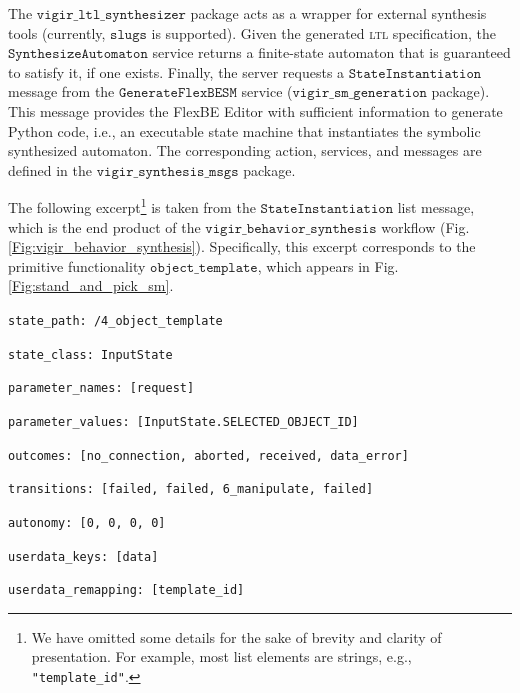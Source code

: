 The $\mathtt{vigir\_ltl\_synthesizer}$ package acts as a wrapper for external synthesis tools (currently, $\mathtt{slugs}$\cite{SLUGS} is supported).
Given the generated \textsc{ltl} specification, the $\mathtt{Synthesize Automaton}$ service returns a finite-state automaton that is guaranteed to satisfy it, if one exists.
Finally, the server requests a $\mathtt{State Instantiation}$ message from the $\mathtt{Generate FlexBE SM}$ service ($\mathtt{vigir\_sm\_generation}$ package).
This message provides the FlexBE Editor with sufficient information to generate Python code, i.e., an executable state machine that instantiates the symbolic synthesized automaton.
The corresponding action, services, and messages are defined in the $\mathtt{vigir\_synthesis\_msgs}$ package.

The following excerpt\footnote{We have omitted some details for the sake of brevity and clarity of presentation. For example, most list elements are strings, e.g., \scriptsize{\texttt{"template\_id"}}.}
 is taken from the $\mathtt{State Instantiation}$ list message, which is the end product of the $\mathtt{vigir\_behavior\_synthesis}$ workflow (Fig. \ref{Fig:vigir_behavior_synthesis}).
Specifically, this excerpt corresponds to the primitive functionality $\mathtt{object\_template}$, which appears in Fig. \ref{Fig:stand_and_pick_sm}.

\begin{description}
\setlength{\itemindent}{-.4in}
	\item \scriptsize{\texttt{state\_path: /4\_object\_template}}
	\item \scriptsize{\texttt{state\_class: InputState}}
	\item \scriptsize{\texttt{parameter\_names: [request]}}
	\item \scriptsize{\texttt{parameter\_values: [InputState.SELECTED\_OBJECT\_ID]}}
	\item \scriptsize{\texttt{outcomes: [no\_connection, aborted, received, data\_error]}}
	\item \scriptsize{\texttt{transitions: [failed, failed, 6\_manipulate, failed]}}
	\item \scriptsize{\texttt{autonomy: [0, 0, 0, 0]}}
	\item \scriptsize{\texttt{userdata\_keys: [data]}}
	\item \scriptsize{\texttt{userdata\_remapping: [template\_id]}}
\end{description}


